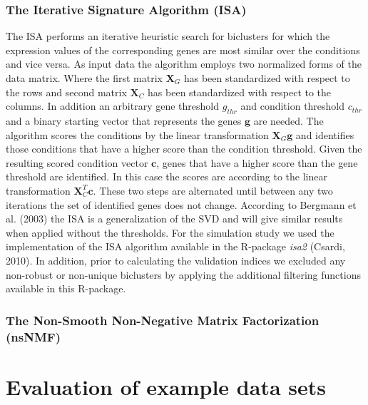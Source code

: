 \subsubsection{The Iterative Signature Algorithm (ISA)}
The ISA performs an iterative heuristic search for biclusters for which the expression values of the corresponding genes are most similar over the conditions and vice versa. As input data the algorithm employs two normalized forms of the data matrix. Where the first matrix $\mathbf{X}_{G}$ has been standardized with respect to the rows and second matrix $\mathbf{X}_{C}$ has been standardized with respect to the columns. In addition an arbitrary gene threshold $g_{thr}$ and condition threshold $c_{thr}$ and a binary starting vector that represents the genes $\mathbf{g}$ are needed.
The algorithm scores the conditions by the linear transformation $\mathbf{X}_{G}\mathbf{g}$ and identifies those conditions that have a higher score than the condition threshold. Given the resulting scored condition vector $\mathbf{c}$, genes that have a higher score than the gene threshold are identified. In this case the scores are according to the linear transformation $\mathbf{X}_{C}^{T}\mathbf{c}$. These two steps are alternated until between any two iterations the set of identified genes does not change. According to Bergmann et al. (2003) the ISA is a generalization of the SVD and will give similar results when applied without the thresholds.
For the simulation study we used the implementation of the ISA algorithm available in the R-package \textit{isa2} (Csardi, 2010). In addition, prior to calculating the validation indices we excluded any non-robust or non-unique biclusters by applying the additional filtering functions available in this R-package.  

\subsubsection{The Non-Smooth Non-Negative Matrix Factorization (nsNMF)}

\section{Evaluation of example data sets}
